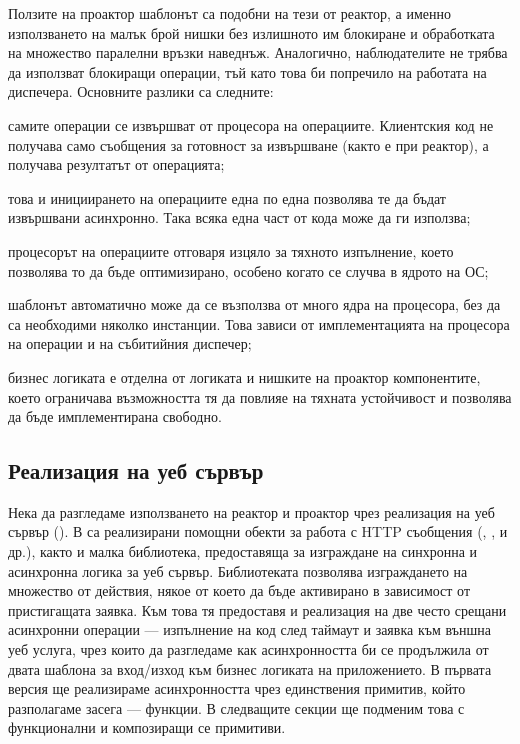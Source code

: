 Ползите на проактор шаблонът са подобни на тези от реактор, а именно използването на малък брой нишки без излишното им блокиране и обработката на множество паралелни връзки наведнъж. Аналогично, наблюдателите не трябва да използват блокиращи операции, тъй като това би попречило на работата на диспечера. Основните разлики са следните:

\begin{itemize*}
  \item самите операции се извършват от процесора на операциите. Клиентския код не получава само съобщения за готовност за извършване (както е при реактор), а получава резултатът от операцията;
  
  \item това и инициирането на операциите една по една позволява те да бъдат извършвани асинхронно. Така всяка една част от кода може да ги използва;
  
  \item процесорът на операциите отговаря изцяло за тяхното изпълнение, което позволява то да бъде оптимизирано, особено когато се случва в ядрото на ОС;
  
  \item шаблонът автоматично може да се възползва от много ядра на процесора, без да са необходими няколко инстанции. Това зависи от имплементацията на процесора на операции и на събитийния диспечер;
  
  \item бизнес логиката е отделна от логиката и нишките на проактор компонентите, което ограничава възможността тя да повлияе на тяхната устойчивост и позволява да бъде имплементирана свободно.
\end{itemize*}

\subsection{Реализация на уеб сървър}
\label{sec:implementing-a-web-server}

Нека да разгледаме използването на реактор и проактор чрез реализация на уеб сървър (). В  са реализирани помощни обекти за работа с HTTP съобщения (, ,  и др.), както и малка библиотека, предоставяща  за изграждане на синхронна и асинхронна логика за уеб сървър. Библиотеката позволява изграждането на множество от действия, някое от което да бъде активирано в зависимост от пристигащата заявка. Към това тя предоставя и реализация на две често срещани асинхронни операции — изпълнение на код след таймаут и заявка към външна уеб услуга, чрез които да разгледаме как асинхронността би се продължила от двата шаблона за вход/изход към бизнес логиката на приложението. В първата версия ще реализираме асинхронността чрез единствения примитив, който разполагаме засега —  функции. В следващите секции ще подменим това с функционални и композиращи се примитиви.

